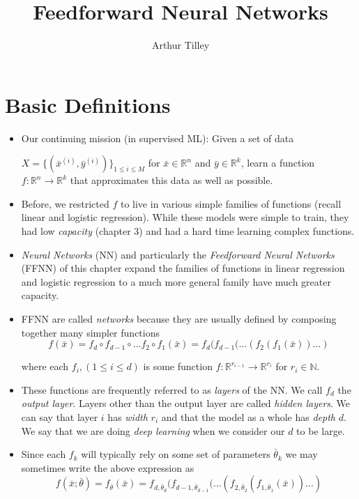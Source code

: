 \documentclass{article}
\title{Feedforward Neural Networks}
\date{}
\author{Arthur Tilley}
\begin{document}
\maketitle

\section{Basic Definitions}
\begin{itemize}
\item Our continuing mission (in supervised ML):
Given a set of data 

$X = \{(\bar{x}^{(i)}, \bar{y}^{(i)})\}_{1 \leq i \leq M}$ for $\bar{x} \in \mathbb{R}^{n}$ and $\bar{y} \in \mathbb{R}^{k}$, learn a function $f:\mathbb{R}^{n} \rightarrow \mathbb{R}^{k}$ that approximates this data as well as possible.

\item Before, we restricted $f$ to live in various simple families of functions (recall linear and logistic regression).  While these models were simple to train, they had low \emph{capacity}  (chapter 3) and had a hard time learning complex functions.

\item \emph{Neural Networks} (NN) and particularly the \emph{Feedforward Neural Networks} (FFNN) of this chapter expand the families of functions in linear regression and logistic regression to a much more general family have much greater capacity.  

\item FFNN are called \emph{networks} because they are usually defined by composing together many simpler functions
$$f(\bar{x})= f_{d} \circ f_{d-1} \circ \ldots f_{2} \circ f_{1} (\bar{x}) =  f_{d}(f_{d-1}(\ldots(f_{2}(f_{1}(\bar{x}))\ldots)$$

where each $f_{i}, (1\leq i \leq d)$ is some function $f:\mathbb{R}^{r_{i-1}} \rightarrow \mathbb{R}^{r_{i}}$ for $r_{i} \in \mathbb{N}$.    

\item These functions  are frequently referred to as \emph{layers} of the NN.  We call $f_{d}$ the \emph{output layer}.  Layers other than the output layer are called \emph{hidden layers}. We can say that layer $i$ has \emph{width} $r_{i}$ and that the model as a whole has \emph{depth} $d$.   We say that we are doing \emph{deep learning} when we consider our $d$ to be large.

\item Since each $f_{k}$ will typically rely on some set of parameters $\bar{\theta}_{k}$ we may sometimes write the above expression as 
$$f(\bar{x} ; \bar{\theta}) = f_{\bar{\theta}}(\bar{x}) = f_{d,\bar{\theta}_{d}}(f_{d-1, \bar{\theta}_{d-1} }(\ldots(f_{2, \bar{\theta}_{2}}(f_{1, \bar{\theta}_{1}}(\bar{x}))\ldots)$$


\end{itemize}
\end{document}
